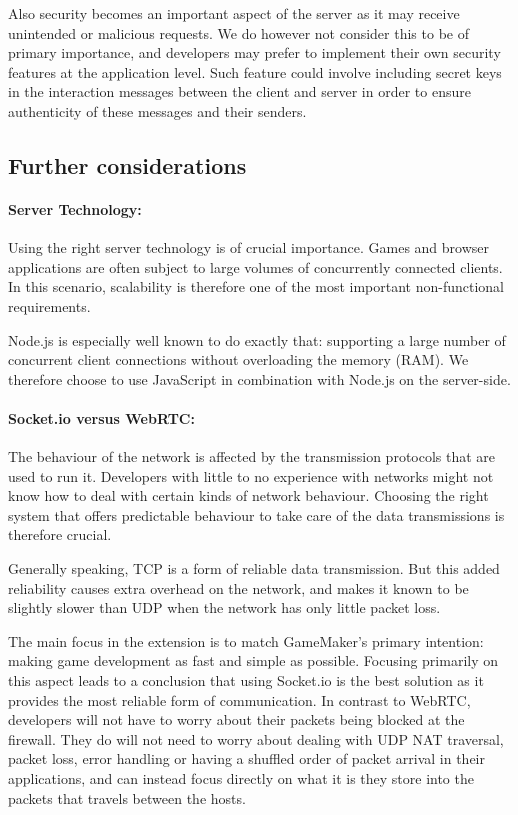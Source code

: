 \documentclass[bsc, 12pt, twoside, singlespacing, parskip, abbrevs, notimes, normalheadings, logo]{styles/infthesis}
\begin{document}
Also security becomes an important aspect of the server as it may receive unintended or malicious requests. We do however not consider this to be of primary importance, and developers may prefer to implement their own security features at the application level. Such feature could involve including secret keys in the interaction messages between the client and server in order to ensure authenticity of these messages and their senders.


\subsection{Further considerations}
\paragraph*{Server Technology:}
Using the right server technology is of crucial importance. Games and browser applications are often subject to large volumes of concurrently connected clients. In this scenario, scalability is therefore one of the most important non-functional requirements. 

Node.js is especially well known to do exactly that: supporting a large number of concurrent client connections without overloading the memory (RAM). We therefore choose to use JavaScript in combination with Node.js on the server-side.

\paragraph*{Socket.io versus WebRTC:}
The behaviour of the network is affected by the transmission protocols that are used to run it. Developers with little to no experience with networks might not know how to deal with certain kinds of network behaviour. Choosing the right system that offers predictable behaviour to take care of the data transmissions is therefore crucial.
 
Generally speaking, TCP is a form of reliable data transmission. But this added reliability causes extra overhead on the network, and makes it known to be slightly slower than UDP when the network has only little packet loss.

The main focus in the extension is to match GameMaker's primary intention: making game development as fast and simple as possible. Focusing primarily on this aspect leads to a conclusion that using Socket.io is the best solution as it provides the most reliable form of communication. In contrast to WebRTC, developers will not have to worry about their packets being blocked at the firewall. They do will not need to worry about dealing with UDP NAT traversal, packet loss, error handling or having a shuffled order of packet arrival in their applications, and can instead focus directly on what it is they store into the packets that travels between the hosts.
\end{document}
